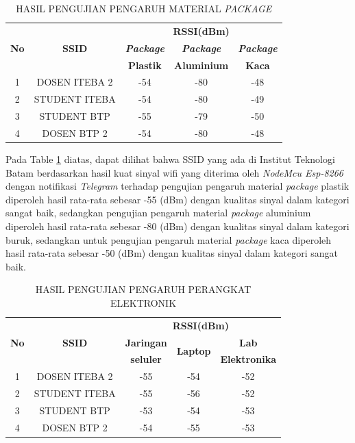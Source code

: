 \documentclass[conference]{IEEEtran}
\begin{document}
\begin{table}[htbp]
        \caption{HASIL PENGUJIAN PENGARUH MATERIAL \textit{PACKAGE}}
        \label{tab6}
        \centering
        \begin{tabular}{|c|c|c|c|c|}
        \hline
        \multirow{3}{*}{\textbf{No}} & \multirow{3}{*}{\textbf{SSID}} & \multicolumn{3}{|c|}{\textbf{RSSI(dBm)}} \\
        \cline{3-5} 
         & & \textbf{\textit{Package}}& \textbf{\textit{Package}} & \textbf{\textit{Package}}\\
         & & \textbf{Plastik} & \textbf{Aluminium} & \textbf{Kaca}\\
        \hline
        1 & DOSEN ITEBA 2 & -54 & -80 & -48 \\ \hline
        2 & STUDENT ITEBA & -54 & -80 & -49 \\ \hline
        3 & STUDENT BTP & -55 & -79 & -50 \\ \hline
        4 & DOSEN BTP 2 & -54 & -80 & -48 \\
        \hline
        \end{tabular}
\end{table}

Pada Table \ref{tab6} diatas, dapat dilihat bahwa SSID yang ada di Institut Teknologi Batam berdasarkan hasil kuat sinyal wifi yang diterima oleh \textit{NodeMcu Esp-8266} dengan notifikasi \textit{Telegram} terhadap pengujian pengaruh material \textit{package} plastik diperoleh hasil rata-rata sebesar -55 (dBm) dengan kualitas sinyal dalam kategori sangat baik, sedangkan pengujian pengaruh material \textit{package} aluminium diperoleh hasil rata-rata sebesar -80 (dBm) dengan kualitas sinyal dalam kategori buruk, sedangkan untuk pengujian pengaruh material \textit{package} kaca diperoleh hasil rata-rata sebesar -50 (dBm) dengan kualitas sinyal dalam kategori sangat baik.

\begin{table}[htbp]
        \caption{HASIL PENGUJIAN PENGARUH PERANGKAT ELEKTRONIK}
        \label{tab7}
        \centering
        \begin{tabular}{|c|c|c|c|c|}
        \hline
        \multirow{3}{*}{\textbf{No}} & \multirow{3}{*}{\textbf{SSID}} & \multicolumn{3}{|c|}{\textbf{RSSI(dBm)}} \\
        \cline{3-5} 
         & & \textbf{Jaringan}& \multirow{2}{*}{\textbf{Laptop}} & \textbf{Lab}\\
         & & \textbf{seluler} &  & \textbf{Elektronika}\\
        \hline
        1 & DOSEN ITEBA 2 & -55 & -54 & -52 \\ \hline
        2 & STUDENT ITEBA & -55 & -56 & -52 \\ \hline
        3 & STUDENT BTP & -53 & -54 & -53 \\ \hline
        4 & DOSEN BTP 2 & -54 & -55 & -53 \\
        \hline
        \end{tabular}
\end{table}
\end{document}

